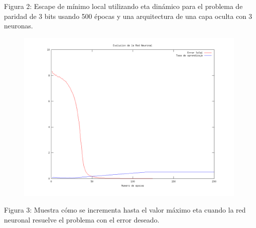 \documentclass[%
    final,
    reprint,
    notitlepage,
    narroweqnarray,
    inline,
    twoside,
    invited
    ]{ieee}
\begin{document}
\begin{center}
\par Figura 2: Escape de mínimo local utilizando eta dinámico para el problema de paridad de 3 bits usando 500 épocas y una arquitectura de una capa oculta con 3 neuronas.
\end{center}

\clearpage

\begin{figure}[H]
\begin{center}
\includegraphics[scale=0.30]{./images/incremento.png}
\label{modelado}
\end{center}
\end{figure}

\begin{center}
\par Figura 3: Muestra cómo se incrementa hasta el valor máximo eta cuando la red neuronal resuelve el problema con el error deseado.
\end{center}




\end{document}
